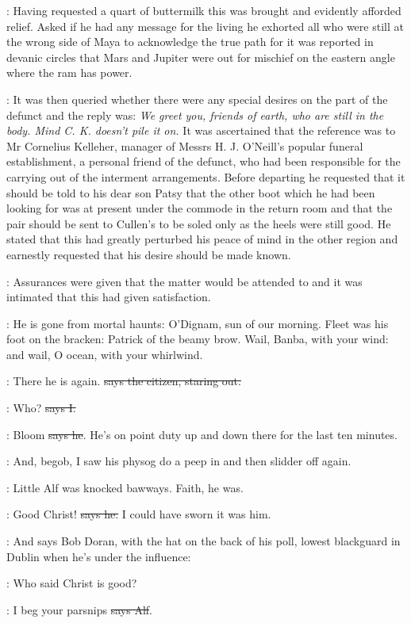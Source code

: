 :
Having requested a quart of buttermilk this was
brought and evidently afforded relief. Asked if he had any message
for the living he exhorted all who were still at the wrong side of Maya
to acknowledge the true path for it was reported in devanic circles that
Mars and Jupiter were out for mischief on the eastern angle where the
ram has power.

:
It was then queried whether there were any special
desires on the part of the defunct and the reply was: \emph{We greet you,
friends of earth, who are still in the body. Mind C. K. doesn't pile it
on.} It was ascertained that the reference was to Mr Cornelius Kelleher,
manager of Messrs H. J. O'Neill's popular funeral establishment, a
personal friend of the defunct, who had been responsible for the carrying
out of the interment arrangements. Before departing he requested that it
should be told to his dear son Patsy that the other boot which he had been
looking for was at present under the commode in the return room and that
the pair should be sent to Cullen's to be soled only as the heels were
still good. He stated that this had greatly perturbed his peace of mind in
the other region and earnestly requested that his desire should be made
known.

:
Assurances were given that the matter would be attended to and it was
intimated that this had given satisfaction.

:
He is gone from mortal haunts: O'Dignam, sun of our morning. Fleet
was his foot on the bracken: Patrick of the beamy brow. Wail, Banba, with
your wind: and wail, O ocean, with your whirlwind.

\citizen:
There he is again.
\sout{says the citizen, staring out.}

:
Who? \sout{says I.}

\citizen:
Bloom \sout{says he}.
He's on point duty up and down there for the last ten
minutes.

\Nq:
And, begob, I saw his physog do a peep in
and then slidder off again.

\Nq:
Little Alf was knocked bawways. Faith, he was.

\bergan:
Good Christ! \sout{says he.}
I could have sworn it was him.

\Nq:
And says Bob Doran, with the hat on the back of his poll, lowest
blackguard in Dublin when he's under the influence:

\doran:
Who said Christ is good?

\bergan:
I beg your parsnips \sout{says Alf}.

